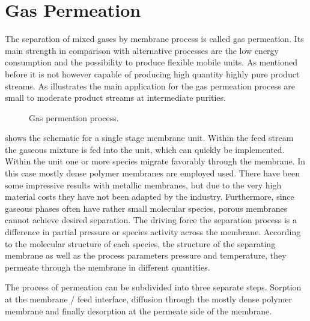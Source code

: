 \section{Gas Permeation}
\label{sec:membrane}
The separation of mixed gases by membrane process is called gas permeation. Its main strength 
in comparison with alternative processes are the low energy consumption and the possibility to 
produce flexible mobile units. As mentioned before it is not however capable of producing high
quantity highly pure product streams. As  illustrates the main application 
for the gas permeation process are small to moderate product streams at intermediate purities.   

\begin{figure}
	\center
	
	\caption{Gas permeation process.}
	\label{fig:gas_permeation} 
\end{figure}

 shows the schematic for a single stage membrane unit. Within the feed stream 
the gaseous mixture is fed into the unit, which can quickly be implemented. Within the unit one or more 
species migrate favorably through the membrane. In this case mostly dense polymer membranes are 
employed used. There have been some impressive results with metallic membranes, but due to 
the very high material costs they have not been adapted by the industry. Furthermore, since gaseous 
phases often have rather small molecular species, porous membranes cannot achieve desired separation. 
The driving force the separation process is a difference in partial pressure or species activity across the 
membrane. According to the molecular structure of each species, the structure of the separating membrane 
as well as the process parameters pressure and temperature, they permeate through the membrane in 
different quantities.

The process of permeation can be subdivided into three separate steps. Sorption at the membrane / 
feed interface, diffusion through the mostly dense polymer membrane and finally desorption at the 
permeate side of the membrane. 
